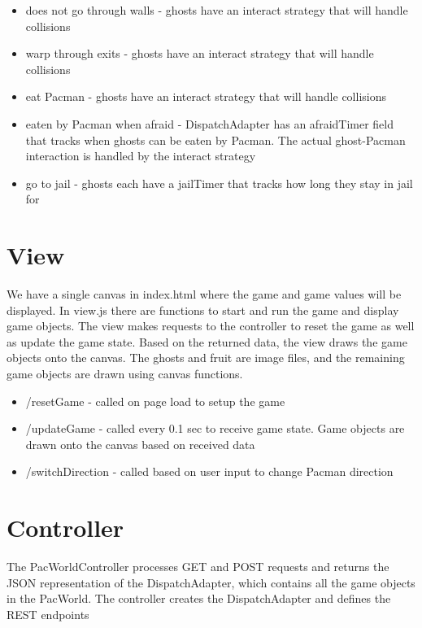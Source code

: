 \documentclass[letterpaper, 11pt]{article}
\begin{document}
\begin{itemize}
\begin{itemize}
    \item does not go through walls - ghosts have an interact strategy that will handle collisions
    \item warp through exits - ghosts have an interact strategy that will handle collisions
    \item eat Pacman - ghosts have an interact strategy that will handle collisions
    \item eaten by Pacman when afraid - DispatchAdapter has an afraidTimer field that tracks when ghosts can be eaten by Pacman. The actual ghost-Pacman interaction is handled by the interact strategy
    \item go to jail - ghosts each have a jailTimer that tracks how long they stay in jail for 
  \end{itemize}
\end{itemize}

\section{View}
We have a single canvas in index.html where the game and game values will be displayed. In view.js there are functions to start and run the game and display game objects. The view makes requests to the controller to reset the game as well as update the game state. Based on the returned data, the view draws the game objects onto the canvas. The ghosts and fruit are image files, and the remaining game objects are drawn using canvas functions.

\begin{itemize}
  \item /resetGame - called on page load to setup the game
  \item /updateGame - called every 0.1 sec to receive game state. Game objects are drawn onto the canvas based on received data
  \item /switchDirection - called based on user input to change Pacman direction
\end{itemize}

\section{Controller}
The PacWorldController processes GET and POST requests and returns the JSON representation of the DispatchAdapter, which contains all the game objects in the PacWorld. The controller creates the DispatchAdapter and defines the REST endpoints \\ 
\end{document}
